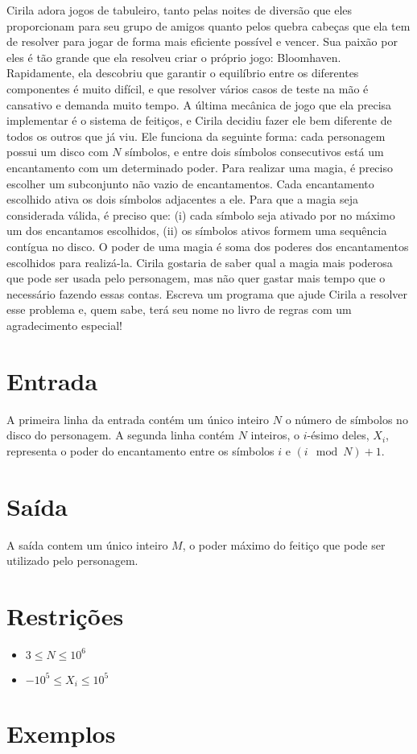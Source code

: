Cirila adora jogos de tabuleiro, tanto pelas noites de diversão que eles proporcionam para seu grupo de amigos quanto pelos quebra cabeças que ela tem de resolver para jogar de forma mais eficiente possível e vencer.
Sua paixão por eles é tão grande que ela resolveu criar o próprio jogo: Bloomhaven. Rapidamente, ela descobriu que garantir o equilíbrio entre os diferentes componentes é muito difícil, e que resolver vários casos de teste na mão é cansativo e demanda muito tempo.
A última mecânica de jogo que ela precisa implementar é o sistema de feitiços, e Cirila decidiu fazer ele bem diferente de todos os outros que já viu.
Ele funciona da seguinte forma: cada personagem possui um disco com $N$ símbolos, e entre dois símbolos consecutivos está um encantamento com um determinado poder.
Para realizar uma magia, é preciso escolher um subconjunto não vazio de encantamentos. Cada encantamento escolhido ativa os dois símbolos adjacentes a ele. Para que a magia seja considerada válida, é preciso que: (i) cada símbolo seja ativado por no máximo um dos encantamos escolhidos, (ii) os símbolos ativos formem uma sequência contígua no disco.
O poder de uma magia é soma dos poderes dos encantamentos escolhidos para realizá-la.
Cirila gostaria de saber qual a magia mais poderosa que pode ser usada pelo personagem, mas não quer gastar mais tempo que o necessário fazendo essas contas.
Escreva um programa que ajude Cirila a resolver esse problema e, quem sabe, terá seu nome no livro de regras com um agradecimento especial!

\section*{Entrada}

A primeira linha da entrada contém um único inteiro $N$ o número de símbolos no disco do personagem.
A segunda linha contém $N$ inteiros, o $i$-ésimo deles, $X_i$, representa o poder do encantamento entre os símbolos $i$ e $(i \mod N) + 1$.

\section*{Saída}

A saída contem um único inteiro $M$, o poder máximo do feitiço que pode ser utilizado pelo personagem.

\section*{Restrições}

\begin{itemize}
\item $3 \leq N \leq 10^6$
\item $-10^5 \leq X_i \leq 10^5$
\end{itemize}


\section*{Exemplos}

\exemplo
